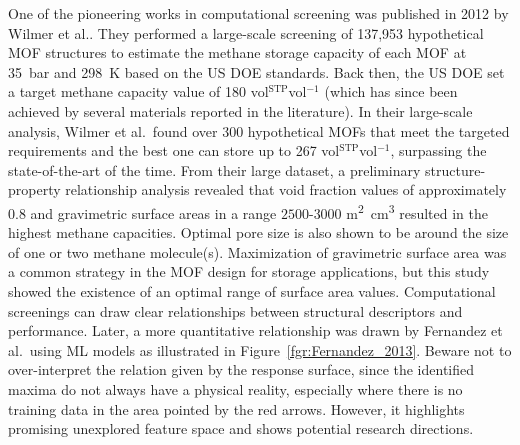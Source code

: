 \documentclass[main.tex]{subfiles}
\begin{document}
One of the pioneering works in computational screening was published in 2012 by Wilmer et al.\autocite{Wilmer_2012}. They performed a large-scale screening of 137,953 hypothetical MOF structures to estimate the methane storage capacity of each MOF at \SI{35}{\bar} and \SI{298}{\kelvin} based on the US DOE standards. Back then, the US DOE set a target methane capacity value of 180 vol{\footnotesize$^\mathrm{STP}$}vol$^{-1}$ (which has since been achieved by several materials reported in the literature). In their large-scale analysis, Wilmer et al.\ found over 300 hypothetical MOFs that meet the targeted requirements and the best one can store up to 267 vol{\footnotesize$^\mathrm{STP}$}vol$^{-1}$, surpassing the state-of-the-art of the time. From their large dataset, a preliminary structure-property relationship analysis revealed that void fraction values of approximately 0.8 and gravimetric surface areas in a range $2500$-$3000$ \si{\square\meter\cubic\centi\meter} resulted in the highest methane capacities. Optimal pore size is also shown to be around the size of one or two methane molecule(s). Maximization of gravimetric surface area was a common strategy in the MOF design for storage applications, but this study showed the existence of an optimal range of surface area values. Computational screenings can draw clear relationships between structural descriptors and performance. Later, a more quantitative relationship was drawn by Fernandez et al.\ using ML models as illustrated in Figure~\ref{fgr:Fernandez_2013}. Beware not to over-interpret the relation given by the response surface, since the identified maxima do not always have a physical reality, especially where there is no training data in the area pointed by the red arrows. However, it highlights promising unexplored feature space and shows potential research directions.
\end{document}
